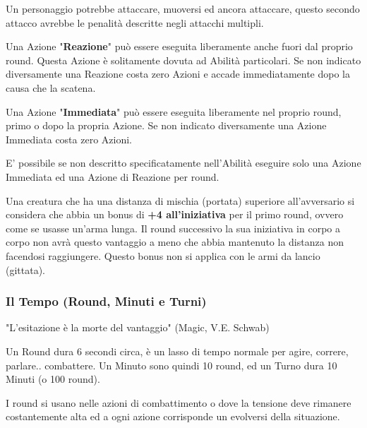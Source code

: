 \documentclass[a4paper,11pt,twoside,openany]{book}
\begin{document}
Un personaggio potrebbe attaccare, muoversi ed ancora attaccare, questo secondo attacco avrebbe le penalità descritte negli attacchi multipli.
\smallskip

Una Azione "\textbf{Reazione}" può essere eseguita liberamente anche fuori dal proprio round. Questa Azione è solitamente dovuta ad Abilità particolari. Se non indicato diversamente una Reazione costa zero Azioni e accade immediatamente dopo la causa che la scatena.

\smallskip

Una Azione "\textbf{Immediata}" può essere eseguita liberamente nel proprio round, primo o dopo la propria Azione. Se non indicato diversamente una Azione Immediata costa zero Azioni.

E' possibile se non descritto specificatamente nell'Abilità eseguire solo una Azione Immediata ed una Azione di Reazione per round.

\begin{note}
Una creatura che ha una distanza di mischia (portata) superiore all'avversario si considera che abbia un bonus di \textbf{+4 all'iniziativa} per il primo round, ovvero come se usasse un'arma lunga. Il round successivo la sua iniziativa in corpo a corpo non avrà questo vantaggio a meno che abbia mantenuto la distanza non facendosi raggiungere.
Questo bonus non si applica con le armi da lancio (gittata). 
\end{note}



\subsubsection{Il Tempo (Round, Minuti e Turni)}

\label{il-tempo-round-minuti-e-turni}
\begin{tcolorbox}[enhanced,arc=5pt,boxrule=0.3pt]{
"L'esitazione è la morte del vantaggio" (Magic, V.E. Schwab)}\end{tcolorbox}\medskip

Un Round dura 6 secondi circa, è un lasso di tempo normale per agire, correre, parlare.. combattere. Un Minuto sono quindi 10 round, ed un Turno dura 10 Minuti (o 100 round).

I round si usano nelle azioni di combattimento o dove la tensione deve rimanere costantemente alta ed a ogni azione corrisponde un evolversi della situazione.

\pagebreak
\end{document}
